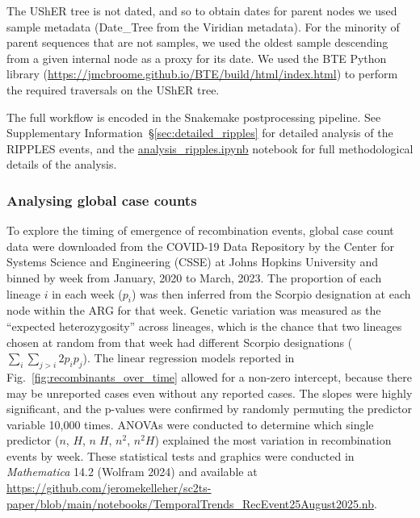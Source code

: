 \documentclass[12pt]{article}
\newcommand{\supref}[1]{Supplementary Information~\S\ref{#1}}
\newcommand{\figref}[1]{Fig.~\ref{#1}}
\begin{document}
The UShER tree is not dated, and so to obtain dates for
parent nodes we used sample metadata
(Date\_Tree from the Viridian metadata). For the minority
of parent sequences that are not samples, we used the oldest
sample descending from a given internal node as a proxy for
its date. We used the BTE Python library
(\url{https://jmcbroome.github.io/BTE/build/html/index.html})
to perform the required traversals on the UShER tree.

The full workflow is encoded in the Snakemake postprocessing
pipeline.
See \supref{sec:detailed_ripples} for detailed analysis
of the RIPPLES events,
and the
\href{https://github.com/jeromekelleher/sc2ts-paper/blob/main/notebooks/analysis\_ripples.ipynb}{analysis\_ripples.ipynb}
notebook for full methodological details of the analysis.

\subsubsection*{Analysing global case counts}
To explore the timing of emergence of recombination events,
global case count data were downloaded from
the COVID-19 Data Repository by the Center
for Systems Science and Engineering (CSSE)
at Johns Hopkins University \cite{Dong2020} and
binned by week from January, 2020 to March, 2023.
The proportion of each lineage $i$ in each week ($p_i$)
was then inferred from the Scorpio designation
at each node within the ARG for that week.
Genetic variation was measured
as the ``expected heterozygosity'' across lineages,
which is the chance that two lineages chosen at random
from that week had different Scorpio designations
($\sum_{i} \sum_{j>i} 2 p_i p_j$).
The linear regression models reported in
\figref{fig:recombinants_over_time}
allowed for a non-zero intercept,
because there may be unreported cases even without any reported cases.
The slopes were highly significant, and
the p-values were confirmed
by randomly permuting the predictor variable 10,000 times.
ANOVAs were conducted to determine which single predictor
($n$, $H$, $n \; H$, $n^2$, $n^2 H$)
explained the most variation in recombination events by week.
These statistical tests and graphics were conducted
in \textit{Mathematica} 14.2 (Wolfram 2024) and
available at
\url{https://github.com/jeromekelleher/sc2ts-paper/blob/main/notebooks/TemporalTrends\_RecEvent25August2025.nb}.
\end{document}
